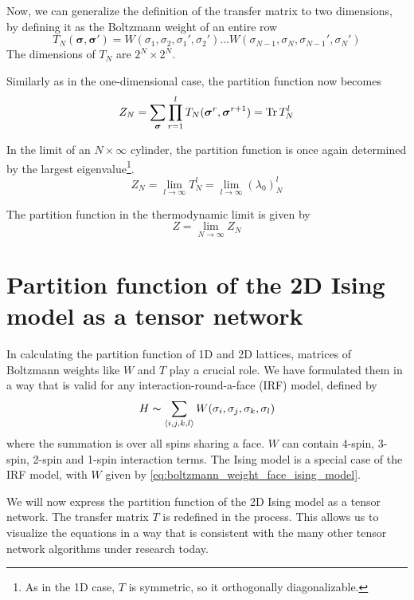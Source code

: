 Now, we can generalize the definition of the transfer matrix to two dimensions, by
defining it as the Boltzmann weight of an entire row
\begin{equation}\label{eq:row_to_row_transfer_matrix}
  T_{N}(\bm{\sigma}, \bm{\sigma'}) = W(\sigma_1, \sigma_2, \sigma_1', \sigma_2') \dots W(\sigma_{N-1}, \sigma_N, \sigma_{N-1}', \sigma_{N}')
\end{equation}
The dimensions of $T_N$ are $2^N \times 2^N$.

Similarly as in the one-dimensional case, the partition function now becomes
\begin{equation}\label{z_n_times_infty}
  Z_N = \sum_{\bm{\sigma}} \prod_{r = 1}^{l} T_{N}(\bm{\sigma}^r, \bm{\sigma}^{r+1}) = \operatorname{Tr} T_{N}^l
\end{equation}

In the limit of an $N \times \infty$ cylinder, the partition function is once again
determined by the largest eigenvalue\footnote{As in the 1D case, $T$ is symmetric, so it
orthogonally diagonalizable.}.
\begin{equation}\label{largest_eigenvalue_transfer_matrix}
  Z_N = \lim_{l \to \infty} T_{N}^{l} = \lim_{l \to \infty} (\lambda_0)_{N}^{l}
\end{equation}

The partition function in the thermodynamic limit is given by
\begin{equation}
  Z = \lim_{N \to \infty} Z_N
\end{equation}

\section{Partition function of the 2D Ising model as a tensor network}
In calculating the partition function of 1D and 2D lattices, matrices of Boltzmann weights
like $W$ and $T$ play a crucial role. We have formulated them in a way that is valid for
any interaction-round-a-face (IRF) model, defined by
\begin{equation}
  H \thicksim \sum_{\langle i, j, k, l \rangle} W(\sigma_i, \sigma_j, \sigma_k,
  \sigma_l)
\end{equation}
where the summation is over all spins sharing a face. $W$ can contain 4-spin,
3-spin, 2-spin and 1-spin interaction terms. The Ising model is a special case of the IRF
model, with $W$ given by \autoref{eq:boltzmann_weight_face_ising_model}.

We will now express the partition function of the 2D Ising model as a tensor network. The
transfer matrix $T$ is redefined in the process. This allows us to visualize the equations
in a way that is consistent with the many other tensor network algorithms under research
today.

